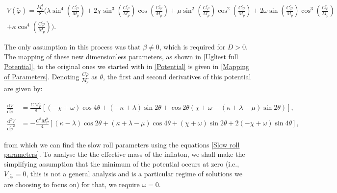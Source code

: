 \documentclass[aps,prd,reprint,preprintnumbers,showpacs,floatfix,nofootinbib,superscript address]{revtex4-2}
\newcommand{\wb}[1]{{\color[RGB]{255,0,0}{\textbf{\textit{[WB: #1]}}}}}
\begin{document}
\begin{widetext}
    \begin{equation} 
    \begin{aligned} \label{Ugliest full Potential}
        V(\tilde{\varphi}) =  \frac{M_p^4}{8} \Bigg(\lambda \sin^4\left( \frac{C \tilde{\varphi}}{M_p}\right) + 2 \chi \sin^3\left( \frac{C \tilde{\varphi}}{M_p}\right) \cos\left( \frac{C \tilde{\varphi}}{M_p}\right)  + \mu \sin^2\left( \frac{C \tilde{\varphi}}{M_p}\right) \cos^2\left( \frac{C \tilde{\varphi}}{M_p}\right) + 2\omega \sin\left( \frac{C \tilde{\varphi}}{M_p}\right) \cos^3\left( \frac{C \tilde{\varphi}}{M_p}\right)  \\ + \kappa \cos^4\left( \frac{C \tilde{\varphi}}{M_p}\right) \Bigg).
    \end{aligned}
\end{equation}
\end{widetext}
The only assumption in this process was that $\beta \neq 0$, which is required for $D > 0$. The mapping of these new dimensionless parameters, as shown in \cref{Ugliest full Potential}, to the original ones we started with in \cref{Potential} is given in \cref{Mapping of Parameters}. Denoting $\frac{C\tilde{\varphi}}{M_p}$ as $\theta$, the first and second derivatives of this potential are given by:

\begin{widetext}
    \begin{subequations} 
        \begin{align} \label{Derivatives of Pot}
            \frac{\text{d}V}{\text{d}\tilde{\varphi}} &= \frac{CM_P^3}{8} \left[ (-\chi + \omega) \cos4\theta + (-\kappa + \lambda) \sin2\theta + \cos2\theta (\chi + \omega - (\kappa + \lambda - \mu ) 
            \sin2\theta) \right] , \\
            \frac{\text{d}^2V}{\text{d}\tilde{\varphi}^2} &= -\frac{C^2M_P^2}{4} \left[ (\kappa - \lambda) \cos2\theta + (\kappa + \lambda - \mu) \cos4\theta + (\chi+\omega) \sin2\theta + 2(-\chi + \omega) \sin4\theta \right],
        \end{align}
    \end{subequations}
\end{widetext}
from which we can find the slow roll parameters using the equations \cref{Slow roll parameters}. To analyse the the effective mass of the inflaton, we shall make the simplifying assumption that the minimum of the potential occurs at zero (i.e., $V_{,\tilde{\varphi}} = 0$, this is not a general analysis and is a particular regime of solutions we are choosing to focus on) for that, we require $\omega = 0$.
\end{document}
